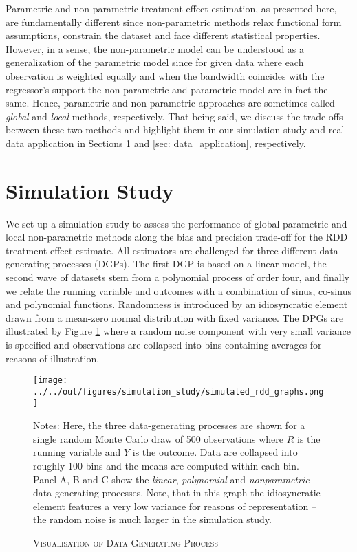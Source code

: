 \documentclass[11pt, a4paper, leqno]{article}
\numberwithin{equation}{section}
\numberwithin{figure}{section}
\numberwithin{table}{section}
\numberwithin{algorithm}{section}
\begin{document}
Parametric and non-parametric treatment effect estimation, as presented here, are fundamentally different since non-parametric methods relax functional form assumptions, constrain the dataset and face different statistical properties. However, in a sense, the non-parametric model can be understood as a generalization of the parametric model since for given data where each observation is weighted equally and when the bandwidth coincides with the regressor's support the non-parametric and parametric model are in fact the same. Hence, parametric and non-parametric approaches are sometimes called \textit{global} and \textit{local} methods, respectively. That being said, we discuss the trade-offs between these two methods and highlight them in our simulation study and real data application in Sections \ref{sec:sim_study} and \ref{sec: data_application}, respectively.


\section{Simulation Study} %
\label{sec:sim_study}

We set up a simulation study to assess the performance of global parametric and local non-parametric methods along the bias and precision trade-off for the RDD treatment effect estimate. All estimators are challenged for three different data-generating processes (DGPs). The first DGP is based on a linear model, the second wave of datasets stem from a polynomial process of order four, and finally we relate the running variable and outcomes with a combination of sinus, co-sinus and polynomial functions. Randomness is introduced by an idiosyncratic element drawn from a mean-zero normal distribution with fixed variance. The DPGs are illustrated by Figure \ref{fig: dgp} where a random noise component with very small variance is specified and observations are collapsed into bins containing averages for reasons of illustration.

\begin{figure}[H]
	\centering
	\texttt{[image: ../../out/figures/simulation\_study/simulated\_rdd\_graphs.png]}
	\caption{\textsc{Visualisation of Data-Generating Process}}
	\label{fig: dgp}
	\medskip
	\justify
	\footnotesize{Notes: Here, the three data-generating processes are shown for a single random Monte Carlo draw of 500 observations where $R$ is the running variable and $Y$ is the outcome. Data are collapsed into roughly 100 bins and the means are computed within each bin. Panel A, B and C show the \textit{linear}, \textit{polynomial} and \textit{nonparametric} data-generating processes. Note, that in this graph the idiosyncratic element features a very low variance for reasons of representation -- the random noise is much larger in the simulation study.}
\end{figure}
\end{document}
